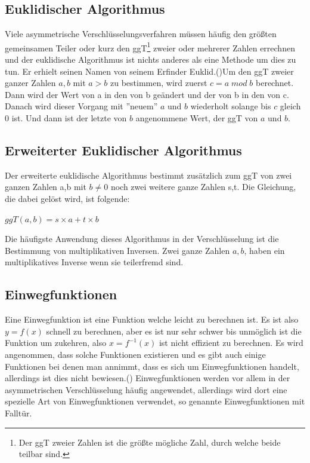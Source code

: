 \documentclass[a4paper,12pt,titlepage]{article}
\begin{document}
\subsection{Euklidischer Algorithmus}
Viele asymmetrische Verschlüsselungsverfahren müssen häufig den größten gemeinsamen Teiler oder kurz den ggT\footnote{Der ggT zweier Zahlen ist die größte mögliche Zahl, durch welche beide teilbar sind.} zweier oder mehrerer Zahlen errechnen und der euklidische Algorithmus ist nichts anderes als eine Methode um dies zu tun. Er erhielt seinen Namen von seinem Erfinder Euklid.(\cite{?})\newline Um den ggT zweier ganzer Zahlen $a, b$ mit $a > b$ zu bestimmen, wird zuerst $c = a \; mod \; b$ berechnet. Dann wird der Wert von a in den von b geändert und der von b in den von c. Danach wird dieser Vorgang mit ''neuem'' $a$ und $b$ wiederholt solange bis $c$ gleich 0 ist. Und dann ist der letzte von $b$ angenommene Wert, der ggT von $a$ und $b$.

\subsection{Erweiterter Euklidischer Algorithmus}
Der erweiterte euklidische Algorithmus bestimmt zusätzlich zum ggT von zwei ganzen Zahlen a,b mit $b \neq 0$ noch zwei weitere ganze Zahlen s,t. Die Gleichung, die dabei gelöst wird, ist folgende: \newline

\begin{center}
$ggT(a,b) = s \times a + t \times b$
\end{center}
Die häufigste Anwendung dieses Algorithmus in der Verschlüsselung ist die Bestimmung von multiplikativen Inversen. Zwei ganze Zahlen $a, b$, haben ein multiplikatives Inverse wenn sie teilerfremd sind.

\subsection{Einwegfunktionen}
Eine Einwegfunktion ist eine Funktion welche leicht zu berechnen ist. Es ist also $y = f(x)$ schnell zu  berechnen, aber es ist nur sehr schwer bis unmöglich ist die Funktion um zukehren, also $x = f^{-1}(x)$ ist nicht effizient zu berechnen. Es wird angenommen, dass solche Funktionen existieren und es gibt auch einige Funktionen bei denen man annimmt, dass es sich um Einwegfunktionen handelt, allerdings ist dies nicht bewiesen.(\cite{?}) Einwegfunktionen werden vor allem in der asymmetrischen Verschlüsselung häufig angewendet, allerdings wird dort eine spezielle Art von Einwegfunktionen verwendet, so genannte Einwegfunktionen mit Falltür.
\end{document}
